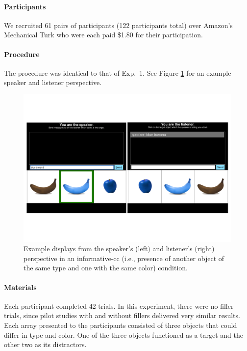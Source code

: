 \documentclass[11pt]{article}
\newcommand{\figref}[1]{Figure \ref{#1}}
\begin{document}
\paragraph{Participants}
We recruited 61 pairs of participants (122 participants total) over Amazon's Mechanical Turk who were each paid \$1.80 for their participation. 


\paragraph{Procedure}

The procedure was identical to that of Exp.~1. See \figref{fig:mturk} for an example speaker and listener perspective.


\begin{figure}[bt!]
	\centering
	\includegraphics[width=1\textwidth]{pics/design_0}
	\caption{Example displays from the speaker's (left) and listener's (right) perspective in an informative-cc (i.e., presence of another object of the same type and one with the same color) condition.
	}
	\label{fig:mturk}
\end{figure}

\paragraph{Materials}

Each participant completed 42 trials. In this experiment, there were no filler trials, since pilot studies with and without fillers delivered very similar results. Each array presented to the participants consisted of three objects that could differ in type and color. One of the three objects functioned as a target and the other two as its distractors.
\end{document}
